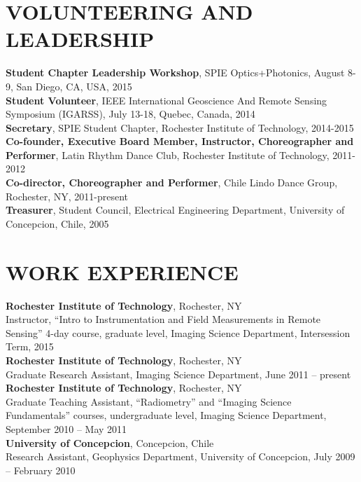 \documentclass[11pt]{res} %
\begin{document}
\begin{resume}
\vspace{-0.1in}
\section{VOLUNTEERING AND LEADERSHIP}
\vspace{0.1in}
{\bf Student Chapter Leadership Workshop}, SPIE Optics+Photonics, August 8-9, San Diego, CA, USA, 2015
\vspace{0.1in}\\
{\bf Student Volunteer}, IEEE International Geoscience And Remote Sensing Symposium (IGARSS), July 13-18, Quebec, Canada, 2014
\vspace{0.1in}\\
{\bf Secretary}, SPIE Student Chapter, Rochester Institute of Technology, 2014-2015
\vspace{0.1in}\\
{\bf Co-founder, Executive Board Member, Instructor, Choreographer and Performer}, Latin Rhythm Dance Club, Rochester Institute of Technology, 2011-2012
\vspace{0.1in}\\
{\bf Co-director, Choreographer and Performer}, Chile Lindo Dance Group, Rochester, NY, 2011-present
\vspace{0.1in}\\
{\bf Treasurer}, Student Council, Electrical Engineering Department, University of Concepcion, Chile, 2005\\

\vspace{-0.1in}
\section{WORK EXPERIENCE}
\vspace{0.1in}
{\bf Rochester Institute of Technology}, Rochester, NY\\
Instructor, ``Intro to Instrumentation and Field Measurements in Remote Sensing'' 4-day course, graduate level, Imaging Science Department, Intersession Term, 2015
\vspace{0.1in}\\
{\bf Rochester Institute of Technology}, Rochester, NY\\
Graduate Research Assistant, Imaging Science Department, June 2011 -- present
\vspace{0.1in}\\
{\bf Rochester Institute of Technology}, Rochester, NY\\
Graduate Teaching Assistant, ``Radiometry'' and  ``Imaging Science Fundamentals'' courses, undergraduate level, Imaging Science Department, September 2010 -- May 2011
\vspace{0.1in}\\
{\bf University of Concepcion}, Concepcion, Chile\\
Research Assistant, Geophysics Department, University of Concepcion, July 2009 -- February 2010



\end{resume}
\end{document}
